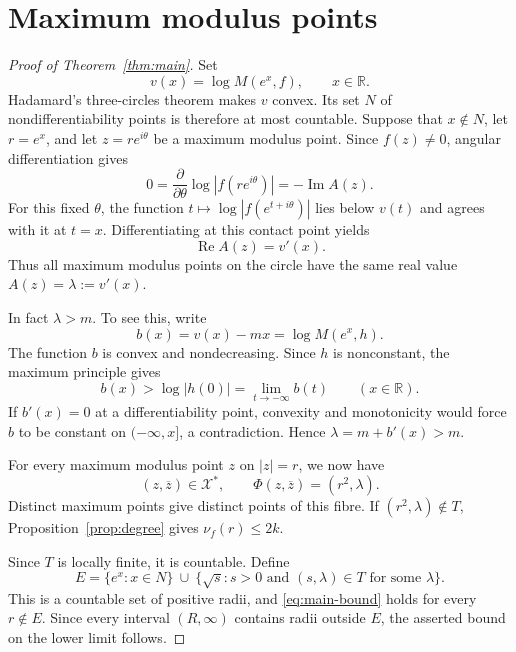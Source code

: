 \documentclass[11pt]{article}
\theoremstyle{remark}
\numberwithin{equation}{section}
\newcommand{\R}{\mathbb R}
\newcommand{\X}{\mathcal X}
\begin{document}
\section{Maximum modulus points}\label{sec:maxima}

\begin{proof}[Proof of Theorem~\ref{thm:main}]
Set
\[
 v(x)=\log M(e^x,f),\qquad x\in\R.
\]
Hadamard's three-circles theorem makes \(v\) convex.
Its set \(N\) of nondifferentiability points is therefore at most
countable.
Suppose that \(x\notin N\), let \(r=e^x\), and let
\(z=re^{i\theta}\) be a maximum modulus point.
Since \(f(z)\ne0\), angular differentiation gives
\begin{equation}\label{eq:angular}
 0=\frac{\partial}{\partial\theta}\log|f(re^{i\theta})|
 =-\operatorname{Im}A(z).
\end{equation}
For this fixed \(\theta\), the function
\(t\mapsto\log|f(e^{t+i\theta})|\) lies below \(v(t)\) and agrees
with it at \(t=x\). Differentiating at this contact point yields
\begin{equation}\label{eq:radial}
 \operatorname{Re}A(z)=v'(x).
\end{equation}
Thus all maximum modulus points on the circle have the same real
value \(A(z)=\lambda:=v'(x)\).

In fact \(\lambda>m\).
To see this, write
\[
 b(x)=v(x)-mx=\log M(e^x,h).
\]
The function \(b\) is convex and nondecreasing.
Since \(h\) is nonconstant, the maximum principle gives
\[
 b(x)>\log|h(0)|=\lim_{t\to-\infty}b(t)
 \qquad(x\in\R).
\]
If \(b'(x)=0\) at a differentiability point, convexity and
monotonicity would force \(b\) to be constant on \(( -\infty,x]\),
a contradiction. Hence \(\lambda=m+b'(x)>m\).

For every maximum modulus point \(z\) on \(|z|=r\), we now have
\begin{equation}\label{eq:maximal-fibre}
 (z,\overline z)\in\X^*,
 \qquad\Phi(z,\overline z)=(r^2,\lambda).
\end{equation}
Distinct maximum points give distinct points of this fibre.
If \((r^2,\lambda)\notin T\), Proposition~\ref{prop:degree} gives
\(\nu_f(r)\le2k\).

Since \(T\) is locally finite, it is countable. Define
\[
 E=\{e^x:x\in N\}\ \cup\
   \{\sqrt{s}:s>0\text{ and }(s,\lambda)\in T
      \text{ for some }\lambda\}.
\]
This is a countable set of positive radii, and
\eqref{eq:main-bound} holds for every \(r\notin E\).
Since every interval \((R,\infty)\) contains radii outside \(E\),
the asserted bound on the lower limit follows.
\end{proof}
\end{document}

